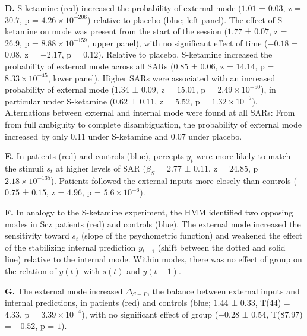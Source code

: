 \documentclass[
]{article}
\begin{document}
\textbf{D.} S-ketamine (red) increased the probability of external mode
(\(1.01\) ± \(0.03\), z = \(30.7\), p =
\(\ensuremath{4.26\times 10^{-206}}\)) relative to placebo (blue; left
panel). The effect of S-ketamine on mode was present from the start of
the session (\(1.77\) ± \(0.07\), z = \(26.9\), p =
\(\ensuremath{8.88\times 10^{-159}}\), upper panel), with no significant
effect of time (\(-0.18\) ± \(0.08\), z = \(-2.17\), p = \(0.12\)).
Relative to placebo, S-ketamine increased the probability of external
mode across all SARs (\(0.85\) ± \(0.06\), z = \(14.14\), p =
\(\ensuremath{8.33\times 10^{-45}}\), lower panel). Higher SARs were
associated with an increased probability of external mode (\(1.34\) ±
\(0.09\), z = \(15.01\), p = \(\ensuremath{2.49\times 10^{-50}}\)), in
particular under S-ketamine (\(0.62\) ± \(0.11\), z = \(5.52\), p =
\(\ensuremath{1.32\times 10^{-7}}\)). Alternations between external and
internal mode were found at all SARs: From from full ambiguity to
complete disambiguation, the probability of external mode increased by
only 0.11 under S-ketamine and 0.07 under placebo.

\textbf{E.} In patients (red) and controls (blue), percepts \(y_t\) were
more likely to match the stimuli \(s_t\) at higher levels of SAR
(\(\beta_S\) = \(2.77\) ± \(0.11\), z = \(24.85\), p =
\(\ensuremath{2.18\times 10^{-135}}\)). Patients followed the external
inputs more closely than controls (\(0.75\) ± \(0.15\), z = \(4.96\), p
= \(\ensuremath{5.6\times 10^{-6}}\)).

\textbf{F.} In analogy to the S-ketamine experiment, the HMM identified
two opposing modes in Scz patients (red) and controls (blue). The
external mode increased the sensitivity toward \(s_t\) (slope of the
psychometric function) and weakened the effect of the stabilizing
internal prediction \(y_{t-1}\) (shift between the dotted and solid
line) relative to the internal mode. Within modes, there was no effect
of group on the relation of \(y(t)\) with \(s(t)\) and \(y(t-1)\).

\textbf{G.} The external mode increased \(\Delta_{S-P}\), the balance
between external inputs and internal predictions, in patients (red) and
controls (blue; \(1.44\) ± \(0.33\), T(\(44\)) = \(4.33\), p =
\(\ensuremath{3.39\times 10^{-4}}\)), with no significant effect of
group (\(-0.28\) ± \(0.54\), T(\(87.97\)) = \(-0.52\), p = \(1\)).
\end{document}
